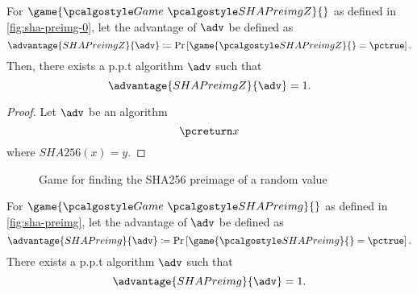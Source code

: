\begin{proposition}
 For $\game{\Game~\algo{SHAPreimgZ}}{}$ as defined in \autoref{fig:sha-preimg-0}, let the advantage of $\adv$ be defined as
 \[
  \advantage{SHAPreimgZ}{\adv} \defeq \pr{\game{\algo{SHAPreimgZ}}{} = \pctrue}.
 \]
 Then, there exists a p.p.t algorithm $\adv$ such that
  \[
  \advantage{SHAPreimgZ}{\adv} = 1.
  \]
\end{proposition}

\begin{proof}
  Let $\adv$ be an algorithm
  \[
   \pcreturn x
  \]
  where $SHA256(x) = y$.
\end{proof}


\begin{figure}[tbhp]
  \begin{center}
    \begin{tcolorbox}[width=5cm]
      \begin{pchstack}[center]
      \end{pchstack}
    \end{tcolorbox}
  \end{center}
  \caption{Game for finding the SHA256 preimage of a random value \label{fig:sha-preimg}}
\end{figure}


\begin{proposition}
 For $\game{\Game~\algo{SHAPreimg}}{}$ as defined in \autoref{fig:sha-preimg}, let the advantage of $\adv$ be defined as
 \[
  \advantage{SHAPreimg}{\adv} \defeq \pr{\game{\algo{SHAPreimg}}{} = \pctrue}.
 \]
 There exists a p.p.t algorithm $\adv$ such that
 \[
 \advantage{SHAPreimg}{\adv} = 1.
 \]
\end{proposition}

